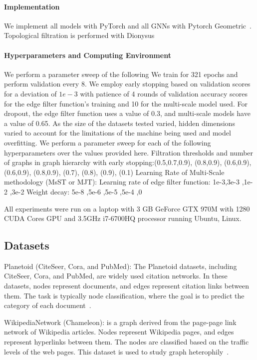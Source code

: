 
\paragraph{Implementation}
We implement all models with PyTorch and all GNNs with Pytorch Geometric~\cite{paszke2019pytorch,fey2019fast}. Topological filtration is performed with Dionysus~\cite{dionysus}

%
%
\paragraph{Hyperparameters and Computing Environment}
\label{ssec:param}
We perform a parameter sweep of the following
We train for 321 epochs and perform validation every 8. We employ early stopping based on validation scores for a deviation of $1e-3$ with patience of 4 rounds of validation accuracy scores for the edge filter function's training and 10 for the multi-scale model used. For dropout, the edge filter function uses a value of 0.3, and multi-scale models have a value of 0.65. As the size of the datasets tested varied, hidden dimensions varied to account for the limitations of the machine being used and model overfitting. We perform a parameter sweep for each of the following hyperparameters over the values provided here. Filtration thresholds and number of graphs in graph hierarchy with early stopping:(0.5,0.7,0.9), (0.8,0.9), (0.6,0.9), (0.6,0.9), (0.8,0.9), (0.7), (0.8), (0.9), (0.1)
Learning Rate of Multi-Scale methodology (MsST or MJT):  
Learning rate of edge filter function: 1e-3,3e-3 ,1e-2 ,3e-2  
Weight decay: 5e-8 ,5e-6 ,5e-5 ,5e-4 ,0 

All experiments were run on a laptop with 3 GB GeForce GTX 970M with 1280 CUDA Cores GPU and 3.5GHz i7-6700HQ processor running Ubuntu, Linux. %


%
%
\subsection{Datasets}
Planetoid (CiteSeer, Cora, and PubMed): The Planetoid datasets, including CiteSeer, Cora, and PubMed, are widely used citation networks. In these datasets, nodes represent documents, and edges represent citation links between them. The task is typically node classification, where the goal is to predict the category of each document~\cite{yang2016revisiting}.

WikipediaNetwork (Chameleon): is a graph derived from the page-page link network of Wikipedia articles. Nodes represent Wikipedia pages, and edges represent hyperlinks between them. The nodes are classified based on the traffic levels of the web pages. This dataset is used to study graph heterophily~\cite{rozemberczki2021multi}.


